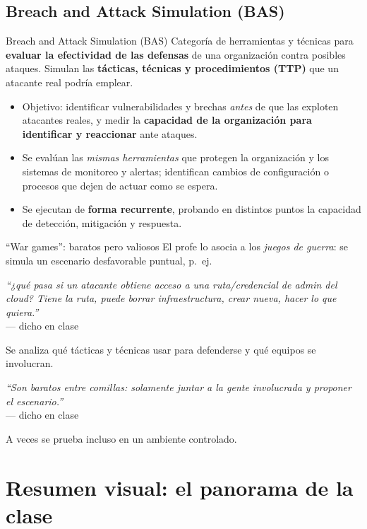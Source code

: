 \documentclass[11pt,a4paper]{article}
\newcommand{\prof}[1]{\par\medskip\noindent\textit{``#1''}\\[-2pt]\hspace*{1em}%
  {\footnotesize\textcolor{black!60}{--- dicho en clase}}\par\medskip\noindent}
\begin{document}
\subsection{Breach and Attack Simulation (BAS)}

\begin{defbox}{Breach and Attack Simulation (BAS)}
Categoría de herramientas y técnicas para \textbf{evaluar la efectividad de las defensas} de una
organización contra posibles ataques. Simulan las \textbf{tácticas, técnicas y procedimientos
(TTP)} que un atacante real podría emplear.
\begin{itemize}[leftmargin=1.4em,itemsep=1pt]
  \item Objetivo: identificar vulnerabilidades y brechas \emph{antes} de que las exploten
        atacantes reales, y medir la \textbf{capacidad de la organización para identificar y
        reaccionar} ante ataques.
  \item Se evalúan las \emph{mismas herramientas} que protegen la organización y los sistemas de
        monitoreo y alertas; identifican cambios de configuración o procesos que dejen de actuar
        como se espera.
  \item Se ejecutan de \textbf{forma recurrente}, probando en distintos puntos la capacidad de
        detección, mitigación y respuesta.
\end{itemize}
\end{defbox}

\begin{anecbox}{``War games'': baratos pero valiosos}
El profe lo asocia a los \emph{juegos de guerra}: se simula un escenario desfavorable puntual,
p.\ ej.\ \prof{¿qué pasa si un atacante obtiene acceso a una ruta/credencial de admin del cloud?
Tiene la ruta, puede borrar infraestructura, crear nueva, hacer lo que quiera.} Se analiza qué
tácticas y técnicas usar para defenderse y qué equipos se involucran. \prof{Son baratos entre
comillas: solamente juntar a la gente involucrada y proponer el escenario.} A veces se prueba
incluso en un ambiente controlado.
\end{anecbox}

\section*{Resumen visual: el panorama de la clase}
\end{document}
